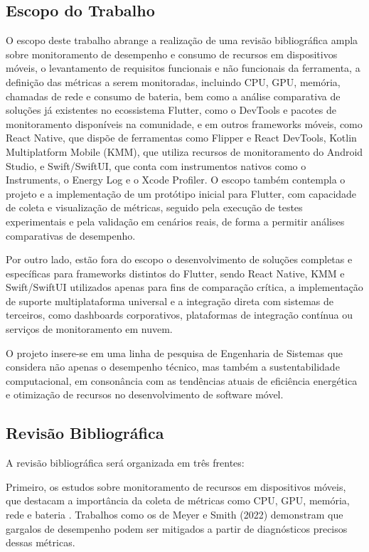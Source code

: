 \documentclass[12pt,a4paper]{article}
\begin{document}
\subsection{Escopo do Trabalho}
O escopo deste trabalho abrange a realização de uma revisão bibliográfica ampla sobre monitoramento de desempenho e consumo de recursos em dispositivos móveis, o levantamento de requisitos funcionais e não funcionais da ferramenta, a definição das métricas a serem monitoradas, incluindo CPU, GPU, memória, chamadas de rede e consumo de bateria, bem como a análise comparativa de soluções já existentes no ecossistema Flutter, como o DevTools e pacotes de monitoramento disponíveis na comunidade, e em outros frameworks móveis, como React Native, que dispõe de ferramentas como Flipper e React DevTools, Kotlin Multiplatform Mobile (KMM), que utiliza recursos de monitoramento do Android Studio, e Swift/SwiftUI, que conta com instrumentos nativos como o Instruments, o Energy Log e o Xcode Profiler. O escopo também contempla o projeto e a implementação de um protótipo inicial para Flutter, com capacidade de coleta e visualização de métricas, seguido pela execução de testes experimentais e pela validação em cenários reais, de forma a permitir análises comparativas de desempenho.

Por outro lado, estão fora do escopo o desenvolvimento de soluções completas e específicas para frameworks distintos do Flutter, sendo React Native, KMM e Swift/SwiftUI utilizados apenas para fins de comparação crítica, a implementação de suporte multiplataforma universal e a integração direta com sistemas de terceiros, como dashboards corporativos, plataformas de integração contínua ou serviços de monitoramento em nuvem.

O projeto insere-se em uma linha de pesquisa de Engenharia de Sistemas que considera não apenas o desempenho técnico, mas também a sustentabilidade computacional, em consonância com as tendências atuais de eficiência energética e otimização de recursos no desenvolvimento de software móvel.
\subsection{Revisão Bibliográfica}
A revisão bibliográfica será organizada em três frentes:  

Primeiro, os estudos sobre monitoramento de recursos em dispositivos móveis, que destacam a importância da coleta de métricas como CPU, GPU, memória, rede e bateria \cite{monitoring}. Trabalhos como os de Meyer e Smith (2022) \cite{performance} demonstram que gargalos de desempenho podem ser mitigados a partir de diagnósticos precisos dessas métricas.  
\end{document}
